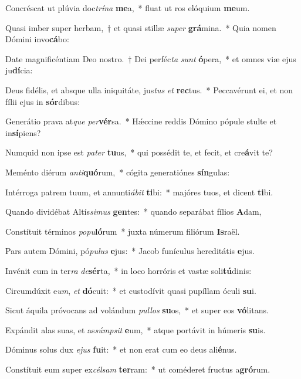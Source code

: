 \item Concréscat ut plúvia doc\textit{trí}\textit{na} \textbf{me}a,~* fluat ut ros elóquium \textbf{me}um.
\item Quasi imber super herbam,~† et quasi stillæ \textit{su}\textit{per} \textbf{grá}mina.~* Quia nomen Dómini invo\textbf{cá}bo:
\item Date magnificéntiam Deo nostro.~† Dei perféc\textit{ta} \textit{sunt} \textbf{ó}pera,~* et omnes viæ ejus ju\textbf{dí}cia:
\item Deus fidélis, et absque ulla iniquitáte, jus\textit{tus} \textit{et} \textbf{rec}tus.~* Peccavérunt ei, et non fílii ejus in \textbf{sór}dibus:
\item Generátio prava at\textit{que} \textit{per}\textbf{vér}sa.~* Hǽccine reddis Dómino pópule stulte et in\textbf{sí}piens?
\item Numquid non ipse est \textit{pa}\textit{ter} \textbf{tu}us,~* qui possédit te, et fecit, et cre\textbf{á}vit te?
\item Meménto diérum \textit{an}\textit{ti}\textbf{quó}rum,~* cógita generatiónes \textbf{sín}gulas:
\item Intérroga patrem tuum, et annunti\textit{á}\textit{bit} \textbf{ti}bi:~* majóres tuos, et dicent \textbf{ti}bi.
\item Quando dividébat Altís\textit{si}\textit{mus} \textbf{gen}tes:~* quando separábat fílios \textbf{A}dam,
\item Constítuit términos \textit{po}\textit{pu}\textbf{ló}rum~* juxta númerum filiórum \textbf{Is}raël.
\item Pars autem Dómini, pó\textit{pu}\textit{lus} \textbf{e}jus:~* Jacob funículus hereditátis \textbf{e}jus.
\item Invénit eum in ter\textit{ra} \textit{de}\textbf{sér}ta,~* in loco horróris et vastæ soli\textbf{tú}dinis:
\item Circumdúxit e\textit{um}, \textit{et} \textbf{dó}cuit:~* et custodívit quasi pupíllam óculi \textbf{su}i.
\item Sicut áquila próvocans ad volándum \textit{pul}\textit{los} \textbf{su}os,~* et super eos \textbf{vó}litans.
\item Expándit alas suas, et as\textit{súmp}\textit{sit} \textbf{e}um,~* atque portávit in húmeris \textbf{su}is.
\item Dóminus solus dux \textit{e}\textit{jus} \textbf{fu}it:~* et non erat cum eo deus ali\textbf{é}nus.
\item Constítuit eum super ex\textit{cél}\textit{sam} \textbf{ter}ram:~* ut coméderet fructus a\textbf{gró}rum.
